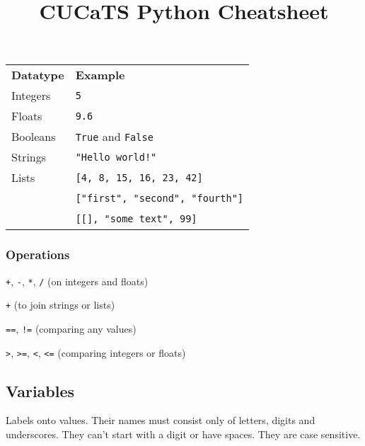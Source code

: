 \documentclass[12pt]{article}
\title{CUCaTS Python Cheatsheet}
\date{}
\begin{document}
	\maketitle
	
	\subsubsection*{}
	
	\begin{tabular}{l l}
		\textbf{Datatype} & \textbf{Example} \\

		Integers &
		\colorbox{codebg}{\lstinline|5|} \\
		
		Floats &
		\colorbox{codebg}{\lstinline|9.6|} \\
		
		Booleans &
		\colorbox{codebg}{\lstinline|True|} and \colorbox{codebg}{\lstinline|False|} \\
		
		Strings &
		\colorbox{codebg}{\lstinline|"Hello world!"|} \\
		
		Lists &
		\colorbox{codebg}{\lstinline|[4, 8, 15, 16, 23, 42]|} \\
		\, &
		\colorbox{codebg}{\lstinline|["first", "second", "fourth"]|} \\
		\, &
		\colorbox{codebg}{\lstinline|[[], "some text", 99]|}
	\end{tabular}
	
	\subsubsection*{Operations}
	
	\lstinline|+|, \lstinline|-|, \lstinline|*|, \lstinline|/| (on integers and floats)
	
	\lstinline|+| (to join strings or lists)
	
	\lstinline|==|, \lstinline|!=| (comparing any values)
	
	\lstinline|>|, \lstinline|>=|, \lstinline|<|, \lstinline|<=| (comparing integers or floats)
	
	\subsection*{Variables}
	
	Labels onto values. Their names must consist only of letters, digits and underscores. They can't start with a digit or have spaces. They are case sensitive.
	
\end{document}
